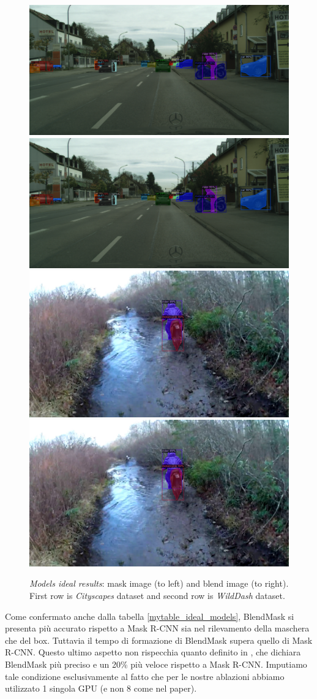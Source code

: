 \documentclass[10pt,twocolumn,letterpaper]{article}
\begin{document}
\begin{figure}[H]
\centering
 \includegraphics[width=0.45\linewidth]{./image/ideal_model_mask_city.png} \includegraphics[width=0.45\linewidth]{./image/ideal_model_mask_city.png} 
   \includegraphics[width=0.45\linewidth]{./image/ideal_model_mask_wd.png}  	\includegraphics[width=0.45\linewidth]{./image/ideal_model_mask_wd.png}   
  \caption{\textit{Models ideal results}: mask image (to left) and blend image (to right). First row is \textit{Cityscapes} dataset and second row is \textit{WildDash} dataset.}
  \label{fig:result_model_ideal}
\noindent
\end{figure}
Come confermato anche dalla tabella \ref{mytable_ideal_models}, BlendMask si presenta pi\`u accurato rispetto a Mask R-CNN sia nel rilevamento della maschera che del box. Tuttavia il tempo di formazione di BlendMask supera quello di Mask R-CNN. Questo ultimo aspetto non rispecchia quanto definito in \cite{Authors2_BlendMask}, che dichiara BlendMask pi\`u preciso e un 20\% pi\`u veloce rispetto a Mask R-CNN. Imputiamo tale condizione esclusivamente al fatto che per le nostre ablazioni abbiamo utilizzato 1 singola GPU (e non 8 come nel paper).
\end{document}
